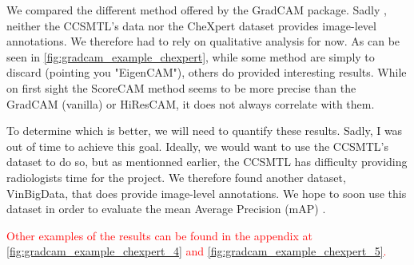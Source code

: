 \documentclass[11pt]{article}
\newcommand\myworries[1]{\textcolor{red}{#1}}
\begin{document}
        We compared the different method offered by the GradCAM package. Sadly , neither the CCSMTL's data nor the CheXpert dataset
        provides image-level annotations. We therefore had to rely on qualitative analysis for now. As can be seen in \ref{fig:gradcam_example_chexpert}, while some method are simply to discard (pointing you "EigenCAM"),
        others do provided interesting results. While on first sight the ScoreCAM method seems to be more precise than the GradCAM (vanilla) or HiResCAM, it does not always correlate with them.

        To determine which is better, we will need to quantify these results. Sadly, I was out of time to achieve this goal. Ideally, we would want to use the CCSMTL's dataset to do so, but as mentionned earlier,
        the CCSMTL has difficulty providing radiologists time for the project. We therefore found another dataset, VinBigData\cite{vinbigdata}, that does provide image-level annotations. We hope to
        soon use this dataset in order to evaluate the mean Average Precision (mAP) \cite{mAP}.

        \myworries{Other examples of the results can be found in the appendix at \ref{fig:gradcam_example_chexpert_4} and \ref{fig:gradcam_example_chexpert_5}.}
\end{document}

